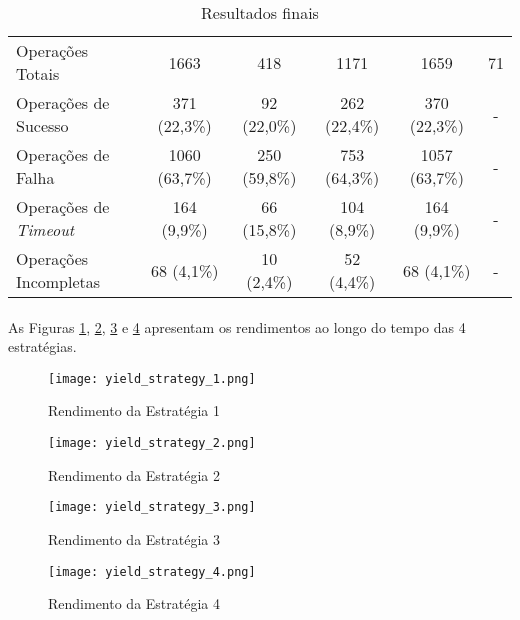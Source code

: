 \begin{table}[!htb]
\begin{center}
{\begin{tabular}{ l|c|c|c|c|c }
            Operações Totais                    & 1663          & 418           & 1171          & 1659          & 71 \\
            Operações de Sucesso                & 371 (22,3\%)  & 92 (22,0\%)   & 262 (22,4\%)  & 370 (22,3\%)  & - \\
            Operações de Falha                  & 1060 (63,7\%) & 250 (59,8\%)  & 753 (64,3\%)  & 1057 (63,7\%) & - \\
            Operações de \textit{Timeout}       & 164 (9,9\%)   & 66 (15,8\%)   & 104 (8,9\%)   & 164 (9,9\%)   & - \\
            Operações Incompletas               & 68 (4,1\%)    & 10 (2,4\%)    & 52 (4,4\%)    & 68 (4,1\%)    & - \\
        \end{tabular}}
        \caption{Resultados finais}
        \label{tab:395}
    \end{center}
\end{table}

\paragraph{} As Figuras \ref{fig:731}, \ref{fig:732}, \ref{fig:733} e \ref{fig:734} apresentam os rendimentos ao longo do tempo das 4 estratégias.

\begin{figure}[!htb]
    \texttt{[image: yield\_strategy\_1.png]}
    \centering
    \caption{Rendimento da Estratégia 1}
    \label{fig:731}
\end{figure}

\begin{figure}[!htb]
    \texttt{[image: yield\_strategy\_2.png]}
    \centering
    \caption{Rendimento da Estratégia 2}
    \label{fig:732}
\end{figure}

\begin{figure}[!htb]
    \texttt{[image: yield\_strategy\_3.png]}
    \centering
    \caption{Rendimento da Estratégia 3}
    \label{fig:733}
\end{figure}

\begin{figure}[!htb]
    \texttt{[image: yield\_strategy\_4.png]}
    \centering
    \caption{Rendimento da Estratégia 4}
    \label{fig:734}
\end{figure}

